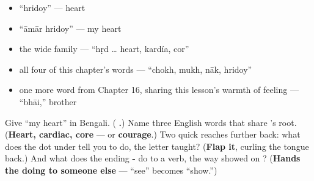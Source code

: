 \begin{itemize}
\raggedright
  \item \textquotedblleft{}hridoy\textquotedblright{} — heart
  \item \textquotedblleft{}āmār hridoy\textquotedblright{} — my heart
  \item the wide family — \textquotedblleft{}hṛd … heart, kardía, cor\textquotedblright{}
  \item all four of this chapter's words — \textquotedblleft{}chokh, mukh, nāk, hridoy\textquotedblright{}
  \item one more word from Chapter 16, sharing this lesson's warmth of feeling — \textquotedblleft{}bhāi,\textquotedblright{} brother
\end{itemize}

\begin{tcolorbox}[breakable,colback=teal!4,colframe=teal!35!black,title={Before you move on}]
Give \textquotedblleft{}my heart\textquotedblright{} in Bengali. (\textbf{ .}) Name three English words that share 's root. (\textbf{Heart, cardiac, core} — or \textbf{courage}.) Two quick reaches further back: what does the dot under  tell you to do, the letter  taught? (\textbf{Flap it}, curling the tongue back.) And what does the ending \textbf{-} do to a verb, the way  showed on ? (\textbf{Hands the doing to someone else} —  \textquotedblleft{}see\textquotedblright{} becomes  \textquotedblleft{}show.\textquotedblright{})
\end{tcolorbox}
